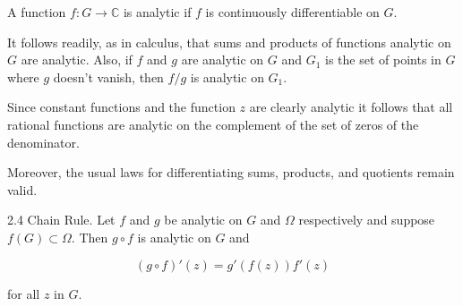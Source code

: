 A function $f: G \to \mathbb{C}$ is analytic if $f$ is continuously differentiable on $G$.

It follows readily, as in calculus, that sums and products of functions analytic on $G$ are analytic. Also, if $f$ and $g$ are analytic on $G$ and $G_1$ is the set of points in $G$ where $g$ doesn't vanish, then $f/g$ is analytic on $G_1$.

Since constant functions and the function $z$ are clearly analytic it follows that all rational functions are analytic on the complement of the set of zeros of the denominator.

Moreover, the usual laws for differentiating sums, products, and quotients remain valid.

2.4 Chain Rule. Let $f$ and $g$ be analytic on $G$ and $\Omega$ respectively and suppose $f(G) \subset \Omega$. Then $g \circ f$ is analytic on $G$ and

$$(g \circ f)'(z) = g'(f(z))f'(z)$$

for all $z$ in $G$.